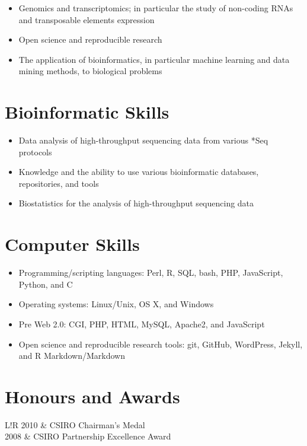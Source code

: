 \documentclass[a4paper, 11pt]{article}
\newcommand\VRule{\color{lightgray}\vrule width 0.5pt}
\begin{document}
\begin{itemize}
   \item Genomics and transcriptomics; in particular the study of non-coding RNAs and transposable elements expression
   \item Open science and reproducible research
   \item The application of bioinformatics, in particular machine learning and data mining methods, to biological problems
\end{itemize}

\section*{Bioinformatic Skills}

\begin{itemize}
   \item Data analysis of high-throughput sequencing data from various *Seq protocols
   \item Knowledge and the ability to use various bioinformatic databases, repositories, and tools
   \item Biostatistics for the analysis of high-throughput sequencing data
\end{itemize}

\section*{Computer Skills}

\begin{itemize}
   \item Programming/scripting languages: Perl, R, SQL, bash, PHP, JavaScript, Python, and C
   \item Operating systems: Linux/Unix, OS X, and Windows
   \item Pre Web 2.0: CGI, PHP, HTML, MySQL, Apache2, and JavaScript
   \item Open science and reproducible research tools: git, GitHub, WordPress, Jekyll, and R Markdown/Markdown
\end{itemize}

\section*{Honours and Awards}
\begin{tabular}{L!{\VRule}R}
   2010 & CSIRO Chairman's Medal \\
   2008 & CSIRO Partnership Excellence Award \\
\end{tabular}
\end{document}
